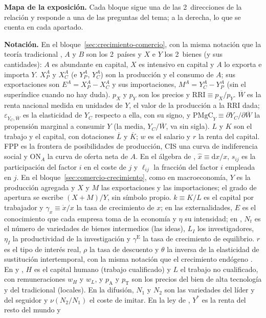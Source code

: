 \documentclass[11pt]{article}
\begin{document}
\begin{anotaciones}
\textbf{Mapa de la exposición.} Cada bloque sigue una de las 2~direcciones de la relación y responde a una de las preguntas del tema; a la derecha, lo que se cuenta en cada apartado.
\begin{infografiacaja}
\caption{Mapa del tema: la pregunta de cada bloque, sus apartados y el hilo que los une}\label{figu:mapa-tema}
\end{infografiacaja}
\end{anotaciones}


\begin{anotaciones}
\textbf{Notación.} En el bloque~\ref{sec:crecimiento-comercio}, con la misma notación que la teoría tradicional , $A$ y $B$ son los 2~países y $X$ e $Y$ los 2~bienes (y sus cantidades): $A$ es abundante en capital, $X$ es intensivo en capital y $A$ lo exporta e importa $Y$. $X^A_P$ y $X^A_C$ (e $Y^A_P$, $Y^A_C$) son la producción y el consumo de $A$; sus exportaciones son $E^A=X^A_P-X^A_C$ y sus importaciones, $M^A=Y^A_C-Y^A_P$ (sin el superíndice cuando no hay duda). $p_X$ y $p_Y$ son los precios y $\mathrm{RRI}\equiv p_X/p_Y$. $\overline W$ es la renta nacional medida en unidades de $Y$, el valor de la producción a la RRI dada; $\varepsilon_{Y_C,\overline W}$ es la elasticidad de $Y_C$ respecto a ella, con su signo, y $\mathrm{PMgC}_Y\equiv\partial Y_C/\partial\overline W$ la propensión marginal a consumir $Y$ (la media, $Y_C/\overline W$, va sin sigla). $L$ y $K$ son el trabajo y el capital, con dotaciones $\overline L$ y $\overline K$; $w$ es el salario y $r$ la renta del capital. FPP es la frontera de posibilidades de producción, CIS una curva de indiferencia social y ON$_A$ la curva de oferta neta de $A$. En el álgebra de , $\hat x\equiv \mathrm{d}x/x$, $s_{ij}$ es la participación del factor $i$ en el coste de $j$ y $\ell_{ij}$ la fracción del factor $i$ empleada en $j$. En el bloque~\ref{sec:comercio-crecimiento}, como en macroeconomía, $Y$ es la producción agregada y $X$ y $M$ las exportaciones y las importaciones; el grado de apertura se escribe $(X+M)/Y$, sin símbolo propio. $k\equiv K/L$ es el capital por trabajador y $\gamma_x\equiv\dot x/x$ la tasa de crecimiento de $x$; en las externalidades, $E$ es el conocimiento que cada empresa toma de la economía y $\eta$ su intensidad; en , $N_t$ es el número de variedades de bienes intermedios (las ideas), $L_I$ los investigadores, $\eta_I$ la productividad de la investigación y $\gamma^{\mathrm E}$ la tasa de crecimiento de equilibrio. $r$ es el tipo de interés real, $\rho$ la tasa de descuento y $\theta$ la inversa de la elasticidad de sustitución intertemporal, con la misma notación que el crecimiento endógeno . En  y , $H$ es el capital humano (trabajo cualificado) y $L$ el trabajo no cualificado, con remuneraciones $w_H$ y $w_L$, y $p_{\mathrm A}$ y $p_{\mathrm T}$ son los precios del bien de alta tecnología y del tradicional (locales). En la difusión, $N_1$ y $N_2$ son las variedades del líder y del seguidor y $\nu(N_2/N_1)$ el coste de imitar. En la ley de , $Y^*$ es la renta del resto del mundo y 
\end{anotaciones}
\end{document}
